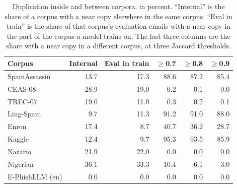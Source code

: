 \begin{table}[t]
\caption{Duplication inside and between corpora, in percent. ``Internal'' is the share of a corpus with a near copy elsewhere in the same corpus. ``Eval in train'' is the share of that corpus's evaluation emails with a near copy in the part of the corpus a model trains on. The last three columns are the share with a near copy in a different corpus, at three Jaccard thresholds.}
\label{tab:within}
\centering\footnotesize
\setlength{\tabcolsep}{3pt}
\begin{tabular}{lrrrrr}
\toprule
Corpus & Internal & Eval in train & $\geq$0.7 & $\geq$0.8 & $\geq$0.9 \\
\midrule
SpamAssassin & 13.7 & 17.3 & 88.6 & 87.2 & 85.4 \\
CEAS-08 & 28.9 & 19.0 & 0.2 & 0.1 & 0.0 \\
TREC-07 & 19.0 & 11.0 & 0.3 & 0.2 & 0.1 \\
Ling-Spam & 9.7 & 11.3 & 91.2 & 91.0 & 88.0 \\
Enron & 17.4 & 8.7 & 40.7 & 36.2 & 28.7 \\
Kaggle & 12.4 & 9.7 & 95.3 & 93.5 & 85.9 \\
Nazario & 21.9 & 22.0 & 0.0 & 0.0 & 0.0 \\
Nigerian & 36.1 & 33.3 & 10.4 & 6.1 & 3.0 \\
E-PhishLLM (en) & 0.0 & 0.0 & 0.0 & 0.0 & 0.0 \\
\bottomrule
\end{tabular}
\end{table}
